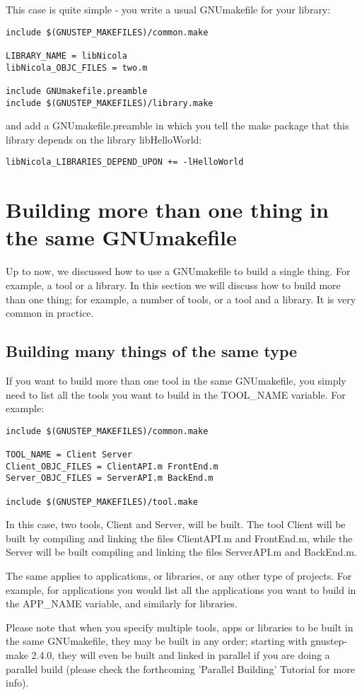 \documentclass[a4paper]{article}
\begin{document}
This case is quite simple - you write a usual GNUmakefile for your
library:
\begin{verbatim}
include $(GNUSTEP_MAKEFILES)/common.make

LIBRARY_NAME = libNicola
libNicola_OBJC_FILES = two.m

include GNUmakefile.preamble
include $(GNUSTEP_MAKEFILES)/library.make
\end{verbatim}
and add a GNUmakefile.preamble in which you tell the make package that
this library depends on the library libHelloWorld:
\begin{verbatim}
libNicola_LIBRARIES_DEPEND_UPON += -lHelloWorld
\end{verbatim}

\section{Building more than one thing in the same GNUmakefile}
Up to now, we discussed how to use a GNUmakefile to build a single
thing.  For example, a tool or a library.  In this section we will
discuss how to build more than one thing; for example, a number of
tools, or a tool and a library.  It is very common in practice.

\subsection{Building many things of the same type}
If you want to build more than one tool in the same GNUmakefile, you
simply need to list all the tools you want to build in the TOOL\_NAME
variable.  For example:
\begin{verbatim}
include $(GNUSTEP_MAKEFILES)/common.make

TOOL_NAME = Client Server
Client_OBJC_FILES = ClientAPI.m FrontEnd.m
Server_OBJC_FILES = ServerAPI.m BackEnd.m

include $(GNUSTEP_MAKEFILES)/tool.make
\end{verbatim}
In this case, two tools, Client and Server, will be built.  The tool
Client will be built by compiling and linking the files ClientAPI.m
and FrontEnd.m, while the Server will be built compiling and linking
the files ServerAPI.m and BackEnd.m.

The same applies to applications, or libraries, or any other type of
projects.  For example, for applications you would list all the
applications you want to build in the APP\_NAME variable, and
similarly for libraries.

Please note that when you specify multiple tools, apps or libraries to
be built in the same GNUmakefile, they may be built in any order;
starting with gnustep-make 2.4.0, they will even be built and linked
in parallel if you are doing a parallel build (please check the
forthcoming 'Parallel Building' Tutorial for more info).
\end{document}
